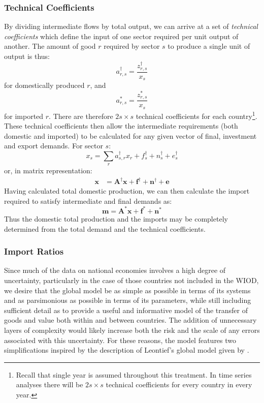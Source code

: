 \documentclass[a4paper]{article}
\begin{document}
\subsubsection*{Technical Coefficients}\label{sec:techcoeffs}
By dividing intermediate flows by total output, we can arrive at a set of \textit{technical coefficients} which define the input of one sector required per unit output of another.
The amount of good $r$ required by sector $s$ to produce a single unit of output is thus:
\begin{equation}\label{eq:adagger}
a_{r,s}^\dagger = \frac{z^\dagger_{r,s}}{x_s}
\end{equation}
for domestically produced $r$, and
\begin{equation}\label{eq:astar}
a_{r,s}^* = \frac{z^*_{r,s}}{x_s}
\end{equation}
for imported $r$. There are therefore $2s \times s$ technical coefficients for each country\footnote{Recall that single year is assumed throughout this treatment.
In time series analyses there will be $2s \times s$ technical coefficients for every country in every year.}.
These technical coefficients then allow the intermediate requirements (both domestic and imported) to be calculated for any given vector of final, investment and export demands. For sector $s$:
$$
x_s = \sum_r{a^\dagger_{s,r}x_r} + f^\dagger_s + n^\dagger_s + e^\dagger_s 
$$
or, in matrix representation:
\begin{align}
\boldsymbol{x}& = 
\boldsymbol{A^\dagger}\boldsymbol{x}
+ 
\boldsymbol{f^\dagger} + \boldsymbol{n^\dagger} + \boldsymbol{e} 
\label{eqn:xIRIO}
\end{align}
Having calculated total domestic production, we can then calculate the import required to satisfy intermediate and final demands as:
\begin{equation}\label{eqn:mIRIO}
\boldsymbol{m}
=
\boldsymbol{A^*}\boldsymbol{x}
+
\boldsymbol{f^*} + \boldsymbol{n^*} 
\end{equation}
Thus the domestic total production and the imports may be completely determined from the total demand and the technical coefficients.

\subsubsection*{Import Ratios}\label{sec:importratios}

Since much of the data on national economies involves a high degree of uncertainty, particularly in the case of those countries not included in the WIOD, we desire that the global model be as simple as possible in terms of its systems and as parsimonious as possible in terms of its parameters, while still including sufficient detail as to provide a useful and informative model of the transfer of goods and value both within and between countries.
The addition of unnecessary layers of complexity would likely increase both the risk and the scale of any errors associated with this uncertainty.
For these reasons, the model features two simplifications inspired by the description of Leontief's global model given by \textcite{duchin_international_2004}.
\end{document}
